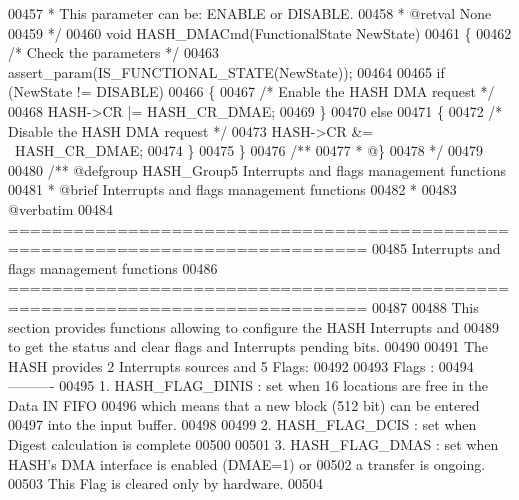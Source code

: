 \begin{DoxyCode}
00457 \textcolor{comment}{  *          This parameter can be: ENABLE or DISABLE.}
00458 \textcolor{comment}{  * @retval None}
00459 \textcolor{comment}{  */}
00460 \textcolor{keywordtype}{void} HASH_DMACmd(FunctionalState NewState)
00461 \{
00462   \textcolor{comment}{/* Check the parameters */}
00463   assert_param(IS\_FUNCTIONAL\_STATE(NewState));
00464 
00465   \textcolor{keywordflow}{if} (NewState != DISABLE)
00466   \{
00467     \textcolor{comment}{/* Enable the HASH DMA request */}
00468     HASH->CR |= HASH_CR_DMAE;
00469   \}
00470   \textcolor{keywordflow}{else}
00471   \{
00472     \textcolor{comment}{/* Disable the HASH DMA request */}
00473     HASH->CR &= ~HASH_CR_DMAE;
00474   \}
00475 \}
00476 \textcolor{comment}{/**}
00477 \textcolor{comment}{  * @\}}
00478 \textcolor{comment}{  */}
00479 
00480 \textcolor{comment}{/** @defgroup HASH\_Group5 Interrupts and flags management functions}
00481 \textcolor{comment}{ *  @brief   Interrupts and flags management functions}
00482 \textcolor{comment}{ *}
00483 \textcolor{comment}{@verbatim   }
00484 \textcolor{comment}{ ===============================================================================}
00485 \textcolor{comment}{                   Interrupts and flags management functions}
00486 \textcolor{comment}{ ===============================================================================  }
00487 \textcolor{comment}{}
00488 \textcolor{comment}{  This section provides functions allowing to configure the HASH Interrupts and }
00489 \textcolor{comment}{  to get the status and clear flags and Interrupts pending bits.}
00490 \textcolor{comment}{  }
00491 \textcolor{comment}{  The HASH provides 2 Interrupts sources and 5 Flags:}
00492 \textcolor{comment}{  }
00493 \textcolor{comment}{  Flags :}
00494 \textcolor{comment}{  ---------- }
00495 \textcolor{comment}{     1. HASH\_FLAG\_DINIS : set when 16 locations are free in the Data IN FIFO }
00496 \textcolor{comment}{                          which means that a  new block (512 bit) can be entered }
00497 \textcolor{comment}{                          into the input buffer.}
00498 \textcolor{comment}{                          }
00499 \textcolor{comment}{     2. HASH\_FLAG\_DCIS :  set when Digest calculation is complete}
00500 \textcolor{comment}{      }
00501 \textcolor{comment}{     3. HASH\_FLAG\_DMAS :  set when HASH's DMA interface is enabled (DMAE=1) or }
00502 \textcolor{comment}{                          a transfer is ongoing.}
00503 \textcolor{comment}{                          This Flag is cleared only by hardware.}
00504 \textcolor{comment}{                           }

\end{DoxyCode}

